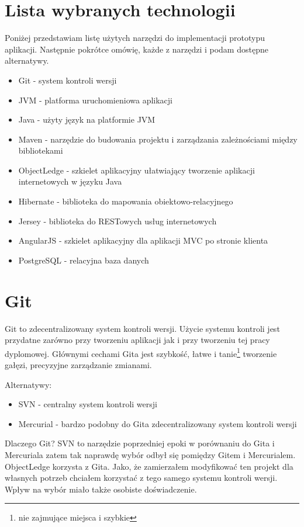 \documentclass[a4paper,onecolumn,oneside,11pt,wide,floatssmall]{mwrep}
\theoremstyle{definition}
\theoremstyle{plain}%
\theoremstyle{remark}
\begin{document}
\section{Lista wybranych technologii}
Poniżej przedstawiam listę użytych narzędzi do implementacji prototypu aplikacji. Następnie pokrótce omówię, każde z narzędzi i podam dostępne alternatywy.

\begin{itemize}
  \item Git - system kontroli wersji
  \item JVM - platforma uruchomieniowa aplikacji
  \item Java - użyty język na platformie JVM
  \item Maven - narzędzie do budowania projektu i zarządzania zależnościami między bibliotekami
  \item ObjectLedge - szkielet aplikacyjny ułatwiający tworzenie aplikacji internetowych w języku Java
  \item Hibernate - biblioteka do mapowania obiektowo-relacyjnego
  \item Jersey - biblioteka do RESTowych usług internetowych
  \item AngularJS - szkielet aplikacyjny dla aplikacji MVC po stronie klienta
  \item PostgreSQL - relacyjna baza danych
\end{itemize}

\section{Git}
Git \cite{gitHome} to zdecentralizowany system kontroli wersji. Użycie systemu kontroli jest przydatne zarówno przy tworzeniu 
aplikacji jak i przy tworzeniu tej pracy dyplomowej. Głównymi cechami Gita jest szybkość, łatwe i tanie\footnote{nie 
zajmujące miejsca i szybkie} tworzenie gałęzi, precyzyjne zarządzanie zmianami.

Alternatywy:
\begin{itemize}
  \item SVN - centralny system kontroli wersji
  \item Mercurial - bardzo podobny do Gita zdecentralizowany system kontroli wersji
\end{itemize}

Dlaczego Git? SVN to narzędzie poprzedniej epoki w porównaniu do Gita i Mercuriala zatem tak naprawdę wybór odbył się
pomiędzy Gitem i Mercurialem. ObjectLedge korzysta z Gita. Jako, że zamierzałem modyfikować ten projekt dla własnych 
potrzeb chciałem korzystać z tego samego systemu kontroli wersji. Wpływ na wybór miało także osobiste doświadczenie.
\end{document}
